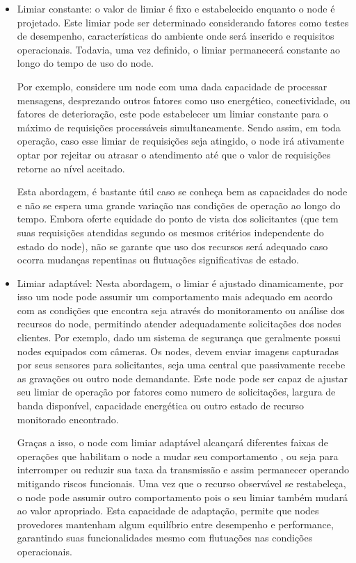\begin{itemize}

    \item Limiar constante: o valor de limiar é fixo e estabelecido enquanto o node é projetado. Este limiar pode ser determinado considerando fatores como testes de desempenho, características do ambiente onde será inserido e requisitos operacionais. Todavia, uma vez definido, o limiar permanecerá constante ao longo do tempo de uso do node. 
    
    Por exemplo, considere um node com uma dada capacidade de processar mensagens, desprezando outros fatores como uso energético, conectividade, ou fatores de deterioração, este pode estabelecer um limiar constante para o máximo de requisições processáveis simultaneamente. Sendo assim, em toda operação, caso esse limiar de requisições seja atingido, o node irá ativamente optar por rejeitar ou atrasar o atendimento até que o valor de requisições retorne ao nível aceitado. 
    
    Esta abordagem, é bastante útil caso se conheça bem as capacidades do node e não se espera uma grande variação nas condições de operação ao longo do tempo. Embora oferte equidade do ponto de vista dos solicitantes (que tem suas requisições atendidas segundo os mesmos critérios independente do estado do node), não se garante que uso dos recursos será adequado caso ocorra  mudanças repentinas ou flutuações significativas de estado.
    
    \item Limiar adaptável: Nesta abordagem, o limiar é ajustado dinamicamente, por isso um node pode assumir um comportamento mais adequado em acordo com as condições que encontra seja através do monitoramento ou análise dos recursos do node, permitindo atender adequadamente solicitações dos nodes clientes. Por exemplo, dado um sistema de segurança que geralmente possui nodes equipados com câmeras. Os nodes, devem enviar imagens capturadas por seus sensores para solicitantes, seja uma central que passivamente recebe as gravações ou outro node demandante. Este node pode ser capaz de ajustar seu limiar de operação por fatores como numero de solicitações, largura de banda disponível, capacidade energética ou outro estado de recurso monitorado encontrado. 
    
    Graças a isso, o node com limiar adaptável alcançará diferentes faixas de operações que habilitam o node a mudar seu comportamento , ou seja para interromper ou reduzir sua taxa da transmissão e assim permanecer operando mitigando riscos funcionais. Uma vez que o recurso observável se restabeleça, o node pode assumir outro comportamento pois o seu limiar também mudará ao valor apropriado. Esta capacidade de adaptação, permite que nodes provedores mantenham algum equilíbrio entre desempenho e performance, garantindo suas funcionalidades mesmo com flutuações nas condições operacionais.
    
\end{itemize}

